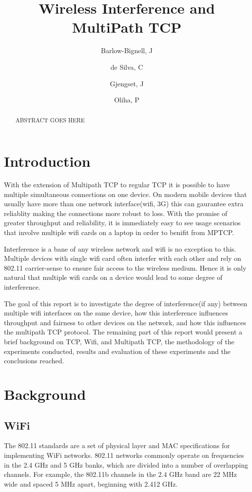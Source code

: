 \documentclass[12pt,a4paper]{article}
\title{Wireless Interference and MultiPath TCP}
\author{Barlow-Bignell, J}
\author{de Silva, C}
\author{Gjengset, J}
\author{Oliha, P}
\affil{University College London}
\date{}
\begin{document}
\maketitle

\begin{abstract}
  ABSTRACT GOES HERE
\end{abstract}
\clearpage

\section{Introduction}
With the extension of Multipath TCP to regular TCP it is possible to have
multiple simultaneous connections on one device. On modern mobile devices that
usually have more than one network interface(wifi, 3G) this can gaurantee extra
reliablity making the connections more robust to loss. With the promise of
greater throughput and reliability, it is immediately easy to see usage
scenarios that involve  multiple wifi cards on a laptop in order to benifit from
MPTCP.

Interference is a bane of any wireless network and wifi is no exception to this.
Multiple devices with single wifi card often interfer with each other and rely
on 802.11 carrier-sense to ensure fair access to the wireless medium. Hence it
is only natural that multiple wifi cards on a device would lead to some degree
of interference.

The goal of this report is to investigate the degree of interference(if any)
between multiple wifi interfaces on the same device, how this interference
influences throughput and fairness to other devices on the network, and how this
influences the multipath TCP protocol. The remaining part of this report would
present a brief background on TCP, Wifi, and Multipath TCP, the methodology of
the experiments conducted, results and evaluation of these experiments and the
conclusions reached.

\section{Background}
\subsection{WiFi}
The 802.11 standards are a set of physical layer and MAC specifications for
implementing WiFi networks.  802.11 networks commonly operate on frequencies in
the 2.4 GHz and 5 GHz banks, which are divided into a number of overlapping
channels. For example, the 802.11b channels in the 2.4 GHz band are 22 MHz wide
and spaced 5 MHz apart, beginning with 2.412 GHz.
\end{document}
